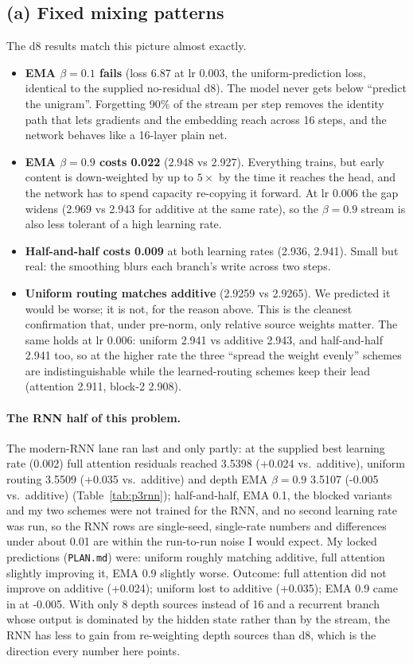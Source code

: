 \subsection*{(a) Fixed mixing patterns}
The d8 results match this picture almost exactly.
\begin{itemize}
\item \textbf{EMA $\beta=0.1$ fails} (loss 6.87 at lr 0.003, the uniform-prediction loss, identical to the supplied no-residual d8). The model never gets below ``predict the unigram''. Forgetting 90\% of the stream per step removes the identity path that lets gradients and the embedding reach across 16 steps, and the network behaves like a 16-layer plain net.
\item \textbf{EMA $\beta=0.9$ costs 0.022} (2.948 vs 2.927). Everything trains, but early content is down-weighted by up to $5\times$ by the time it reaches the head, and the network has to spend capacity re-copying it forward. At lr 0.006 the gap widens (2.969 vs 2.943 for additive at the same rate), so the $\beta=0.9$ stream is also less tolerant of a high learning rate.
\item \textbf{Half-and-half costs 0.009} at both learning rates (2.936, 2.941). Small but real: the smoothing blurs each branch's write across two steps.
\item \textbf{Uniform routing matches additive} (2.9259 vs 2.9265). We predicted it would be worse; it is not, for the reason above. This is the cleanest confirmation that, under pre-norm, only relative source weights matter. The same holds at lr 0.006: uniform 2.941 vs additive 2.943, and half-and-half 2.941 too, so at the higher rate the three ``spread the weight evenly'' schemes are indistinguishable while the learned-routing schemes keep their lead (attention 2.911, block-2 2.908).
\end{itemize}
\paragraph{The RNN half of this problem.} The modern-RNN lane ran last and only partly: at the supplied best learning rate (0.002) full attention residuals reached 3.5398 (+0.024 vs.\ additive), uniform routing 3.5509 (+0.035 vs.\ additive) and depth EMA $\beta=0.9$ 3.5107 (-0.005 vs.\ additive) (Table~\ref{tab:p3rnn}); half-and-half, EMA 0.1, the blocked variants and my two schemes were not trained for the RNN, and no second learning rate was run, so the RNN rows are single-seed, single-rate numbers and differences under about 0.01 are within the run-to-run noise I would expect. My locked predictions (\texttt{PLAN.md}) were: uniform roughly matching additive, full attention slightly improving it, EMA 0.9 slightly worse. Outcome: full attention did not improve on additive (+0.024); uniform lost to additive (+0.035); EMA 0.9 came in at -0.005. With only 8 depth sources instead of 16 and a recurrent branch whose output is dominated by the hidden state rather than by the stream, the RNN has less to gain from re-weighting depth sources than d8, which is the direction every number here points.

